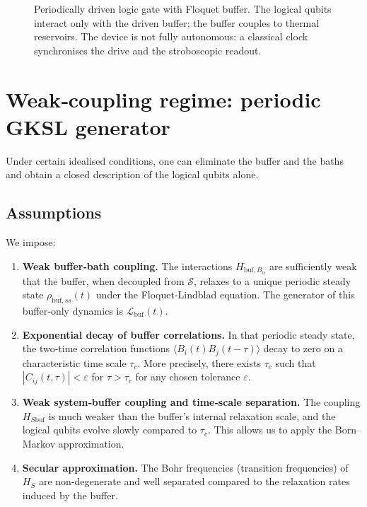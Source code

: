 \documentclass[11pt,a4paper]{article}
\theoremstyle{definition}
\theoremstyle{remark}
\newcommand{\calS}{\mathcal{S}}
\newcommand{\calB}{\mathcal{B}}
\begin{document}
\begin{figure}[h]
\centering
{}
\caption{Periodically driven logic gate with Floquet buffer. The logical qubits interact only with the driven buffer; the buffer couples to thermal reservoirs. The device is not fully autonomous: a classical clock synchronises the drive and the stroboscopic readout.}
\label{fig:schematic}
\end{figure}

\section{Weak‑coupling regime: periodic GKSL generator}\label{sec:weak}
Under certain idealised conditions, one can eliminate the buffer and the baths and obtain a closed description of the logical qubits alone.

\subsection{Assumptions}
We impose:
\begin{enumerate}[label=(A\arabic*),leftmargin=*]
    \item \textbf{Weak buffer‑bath coupling.} The interactions $H_{\text{buf},B_\alpha}$ are sufficiently weak that the buffer, when decoupled from $\calS$, relaxes to a unique periodic steady state $\rho_{\text{buf},ss}(t)$ under the Floquet‑Lindblad equation. The generator of this buffer‑only dynamics is $\mathcal{L}_{\text{buf}}(t)$.
    \item \textbf{Exponential decay of buffer correlations.} In that periodic steady state, the two‑time correlation functions $\langle B_i(t)B_j(t-\tau)\rangle$ decay to zero on a characteristic time scale $\tau_c$. More precisely, there exists $\tau_c$ such that $|C_{ij}(t,\tau)|<\varepsilon$ for $\tau>\tau_c$ for any chosen tolerance $\varepsilon$.
    \item \textbf{Weak system‑buffer coupling and time‑scale separation.} The coupling $H_{S\text{buf}}$ is much weaker than the buffer’s internal relaxation scale, and the logical qubits evolve slowly compared to $\tau_c$. This allows us to apply the Born–Markov approximation.
    \item \textbf{Secular approximation.} The Bohr frequencies (transition frequencies) of $H_S$ are non‑degenerate and well separated compared to the relaxation rates induced by the buffer.
\end{enumerate}
\end{document}
